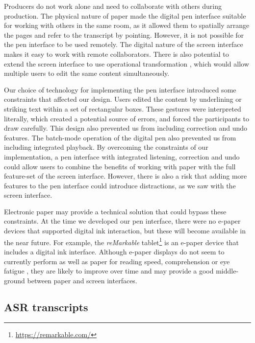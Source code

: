 Producers do not work alone and need to collaborate with others during production. The physical nature of paper made
the digital pen interface suitable for working with others in the same room, as it allowed them to spatially arrange
the pages and refer to the transcript by pointing. However, it is not possible for the pen interface to be used
remotely. The digital nature of the screen interface makes it easy to work with remote collaborators. There is also
potential to extend the screen interface to use operational transformation \citep{Sun2004}, which would allow multiple
users to edit the same content simultaneously.

Our choice of technology for implementing the pen interface introduced some constraints that affected our design.
Users edited the content by underlining or striking text within a set of rectangular boxes. These gestures were
interpreted literally, which created a potential source of errors, and forced the participants to draw carefully. This
design also prevented us from including correction and undo features. The batch-mode operation of the digital pen also
prevented us from including integrated playback.  By overcoming the constraints of our implementation, a pen interface
with integrated listening, correction and undo could allow users to combine the benefits of working with paper with the
full feature-set of the screen interface. However, there is also a risk that adding more features to the pen
interface could introduce distractions, as we saw with the screen interface.

Electronic paper may provide a technical solution that could bypass these constraints. At the time we developed our pen
interface, there were no e-paper devices that supported digital ink interaction, but these will become available in the
near future.  For example, the \textit{reMarkable} tablet\footnote{\url{https://remarkable.com/}} is an e-paper device
that includes a digital ink interface. Although e-paper displays do not seem to currently perform as well as paper for
reading speed, comprehension or eye fatigue \citep{Jeong2012, Daniel2013}, they are likely to improve over time and may
provide a good middle-ground between paper and screen interfaces. 




\subsection{ASR transcripts}




